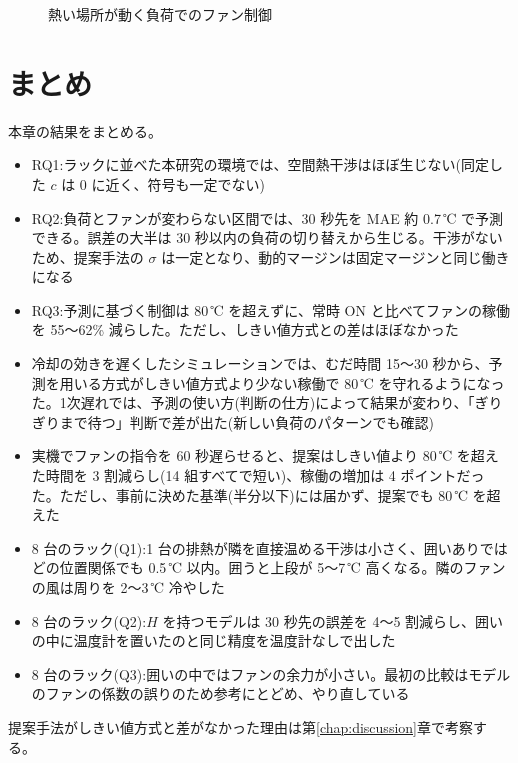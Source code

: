 \begin{figure}[tb]
  \centering
  \caption{熱い場所が動く負荷でのファン制御}
  \label{fig:eval-rack8-stagger}
\end{figure}

\section{まとめ}\label{sec:eval-summary}
本章の結果をまとめる。

\begin{itemize}
  \item RQ1:ラックに並べた本研究の環境では、空間熱干渉はほぼ生じない(同定した $c$ は 0 に近く、符号も一定でない)
  \item RQ2:負荷とファンが変わらない区間では、30 秒先を MAE 約 0.7\,℃ で予測できる。誤差の大半は 30 秒以内の負荷の切り替えから生じる。干渉がないため、提案手法の $\sigma$ は一定となり、動的マージンは固定マージンと同じ働きになる
  \item RQ3:予測に基づく制御は 80\,℃ を超えずに、常時 ON と比べてファンの稼働を 55〜62\% 減らした。ただし、しきい値方式との差はほぼなかった
  \item 冷却の効きを遅くしたシミュレーションでは、むだ時間 15〜30 秒から、予測を用いる方式がしきい値方式より少ない稼働で 80\,℃ を守れるようになった。1次遅れでは、予測の使い方(判断の仕方)によって結果が変わり、「ぎりぎりまで待つ」判断で差が出た(新しい負荷のパターンでも確認)
  \item 実機でファンの指令を 60 秒遅らせると、提案はしきい値より 80\,℃ を超えた時間を 3 割減らし(14 組すべてで短い)、稼働の増加は 4 ポイントだった。ただし、事前に決めた基準(半分以下)には届かず、提案でも 80\,℃ を超えた
  \item 8 台のラック(Q1):1 台の排熱が隣を直接温める干渉は小さく、囲いありではどの位置関係でも 0.5\,℃ 以内。囲うと上段が 5〜7\,℃ 高くなる。隣のファンの風は周りを 2〜3\,℃ 冷やした
  \item 8 台のラック(Q2):$H$ を持つモデルは 30 秒先の誤差を 4〜5 割減らし、囲いの中に温度計を置いたのと同じ精度を温度計なしで出した
  \item 8 台のラック(Q3):囲いの中ではファンの余力が小さい。最初の比較はモデルのファンの係数の誤りのため参考にとどめ、やり直している
\end{itemize}

提案手法がしきい値方式と差がなかった理由は第\ref{chap:discussion}章で考察する。
